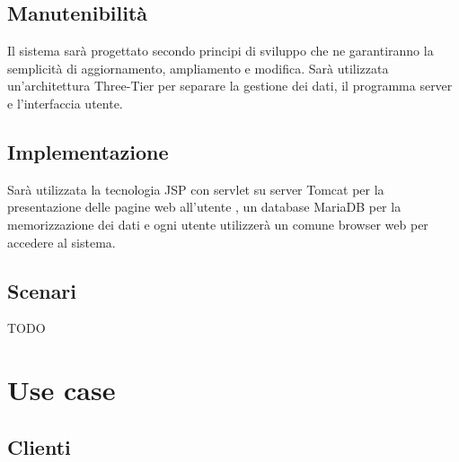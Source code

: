 \documentclass[12pt,a4paper]{article}
\begin{document}
\subsection{Manutenibilità}
Il sistema sarà progettato secondo principi di sviluppo che ne garantiranno la semplicità di aggiornamento, ampliamento e modifica.
Sarà utilizzata un'architettura Three-Tier per separare la gestione dei dati, il programma server e l'interfaccia utente.

\subsection{Implementazione}
Sarà utilizzata la tecnologia JSP con servlet su server Tomcat per la presentazione delle pagine web all'utente , un database MariaDB per la memorizzazione dei dati e ogni utente utilizzerà un comune browser web per accedere al sistema.

\subsection{Scenari}
 TODO

\section{Use case}
\subsection{Clienti}
\end{document}
